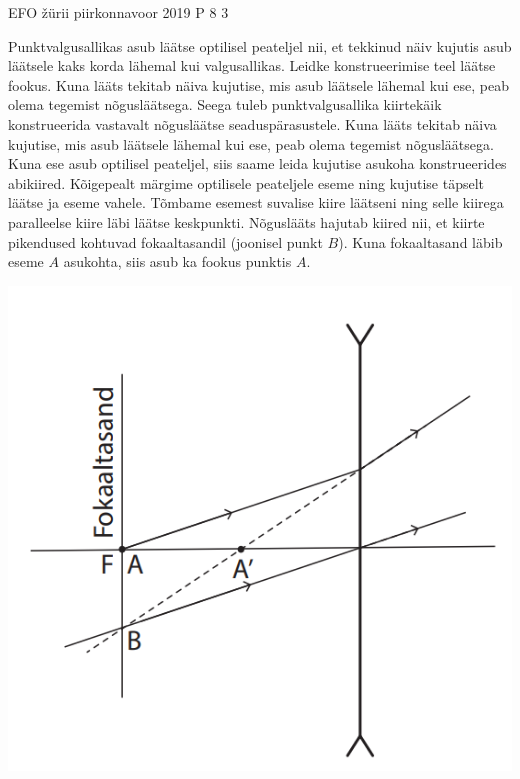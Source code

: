 {EFO žürii} %
{piirkonnavoor} %
{2019} %
{P 8} %
{3} %
{
\ifStatement
Punktvalgusallikas asub läätse optilisel peateljel nii, et tekkinud näiv kujutis asub läätsele kaks korda lähemal kui valgusallikas. Leidke konstrueerimise teel läätse fookus.
\fi
\ifHint
Kuna lääts tekitab näiva kujutise, mis asub läätsele lähemal kui ese, peab olema tegemist nõgusläätsega. Seega tuleb punktvalgusallika kiirtekäik konstrueerida vastavalt nõgusläätse seaduspärasustele.
\fi
\ifSolution
Kuna lääts tekitab näiva kujutise, mis asub läätsele lähemal kui ese, peab olema tegemist nõgusläätsega. Kuna ese asub optilisel peateljel, siis saame leida kujutise asukoha konstrueerides abikiired. Kõigepealt märgime optilisele peateljele eseme ning kujutise täpselt läätse ja eseme vahele. Tõmbame esemest suvalise kiire läätseni ning selle kiirega paralleelse kiire läbi läätse keskpunkti. Nõguslääts hajutab kiired nii, et kiirte pikendused kohtuvad fokaaltasandil (joonisel punkt $B$). Kuna fokaaltasand läbib eseme $A$ asukohta, siis asub ka fookus punktis $A$.
\begin{center}
	\includegraphics[width=0.5\linewidth]{2019-v2p-08-lah.PNG}
\end{center}
\fi
}
